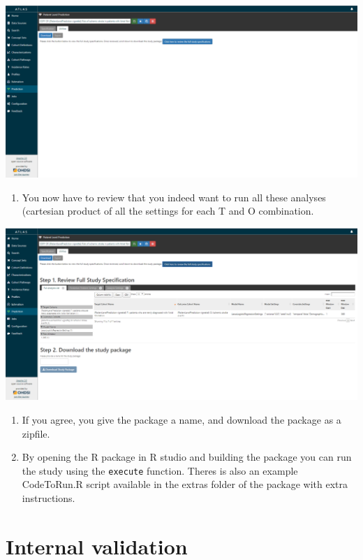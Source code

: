 \documentclass[]{book}
\providecommand{\tightlist}{%
  \setlength{\itemsep}{0pt}\setlength{\parskip}{0pt}}
\begin{document}
\includegraphics[width=1\linewidth]{images/PatientLevelPrediction/atlasdownload1}

\begin{enumerate}
\def\labelenumi{\arabic{enumi}.}
\setcounter{enumi}{1}
\tightlist
\item
  You now have to review that you indeed want to run all these analyses
  (cartesian product of all the settings for each T and O combination.
\end{enumerate}

\includegraphics[width=1\linewidth]{images/PatientLevelPrediction/atlasdownload2}

\begin{enumerate}
\def\labelenumi{\arabic{enumi}.}
\setcounter{enumi}{2}
\item
  If you agree, you give the package a name, and download the package as
  a zipfile.
\item
  By opening the R package in R studio and building the package you can
  run the study using the \texttt{execute} function. Theres is also an
  example CodeToRun.R script available in the extras folder of the
  package with extra instructions.
\end{enumerate}

\section{Internal validation}\label{internal-validation}
\end{document}

